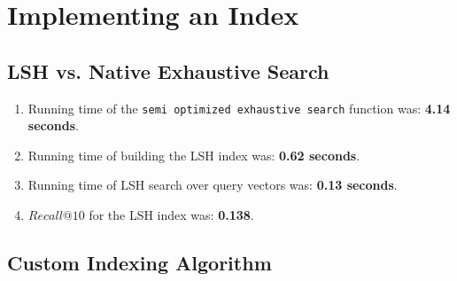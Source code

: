 \documentclass[12pt]{article}
\begin{document}
\section{Implementing an Index}

\subsection{LSH vs. Native Exhaustive Search}

\begin{enumerate}
    \item Running time of the \texttt{semi optimized exhaustive search} function was: \textbf{4.14 seconds}.
    \item Running time of building the LSH index was: \textbf{0.62 seconds}.
    \item Running time of LSH search over query vectors was: \textbf{0.13 seconds}.
    \item $Recall@10$ for the LSH index was: \textbf{0.138}.
\end{enumerate}

\subsection{Custom Indexing Algorithm}




\end{document}
